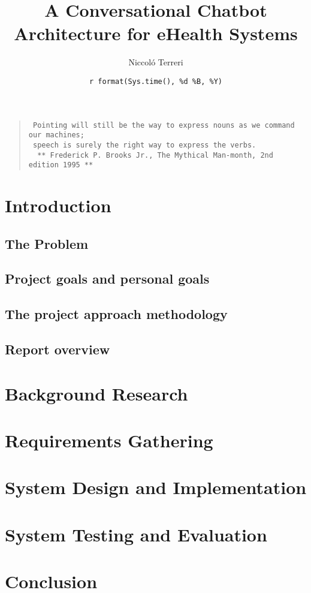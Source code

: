 \documentclass[12pt,A4paper,twoside]{report}
\title{A Conversational Chatbot Architecture for eHealth Systems}
\author{Niccoló Terreri}
\date{\texttt{r\ format(Sys.time(),\ \textquotesingle{}\%d\ \%B,\ \%Y\textquotesingle{})}}
\begin{document}
\maketitle

{
\setcounter{tocdepth}{2}
\tableofcontents
}
\begin{quote}
\begin{verbatim}
 Pointing will still be the way to express nouns as we command our machines;
 speech is surely the right way to express the verbs.
  ** Frederick P. Brooks Jr., The Mythical Man-month, 2nd edition 1995 **
\end{verbatim}
\end{quote}

\chapter{Introduction}\label{introduction}

\section{The Problem}\label{the-problem}

\section{Project goals and personal
goals}\label{project-goals-and-personal-goals}

\section{The project approach
methodology}\label{the-project-approach-methodology}

\section{Report overview}\label{report-overview}

\chapter{Background Research}\label{background-research}

\chapter{Requirements Gathering}\label{requirements-gathering}

\chapter{System Design and
Implementation}\label{system-design-and-implementation}

\chapter{System Testing and
Evaluation}\label{system-testing-and-evaluation}

\chapter{Conclusion}\label{conclusion}
\end{document}
